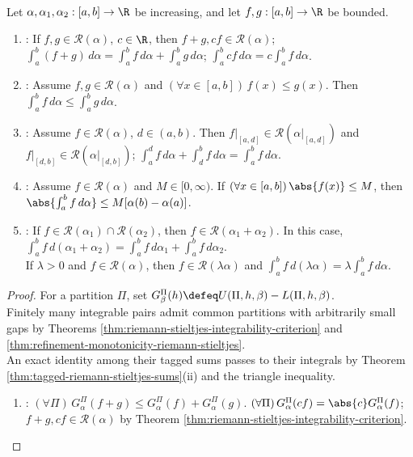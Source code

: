 \begin{theorem} \label{thm:riemann-stieltjes-integral-properties} \\
Let $\alpha,\alpha_1,\alpha_2:[a,b]\to\R$ be increasing, and let $f,g:[a,b]\to\R$ be bounded.
\begin{enumerate}[label=(\roman*)]
\setlength{\itemsep}{0pt}
\item {}: If $f,g\in\mathcal{R}(\alpha)$, $c\in\R$, then $f+g,cf\in\mathcal{R}(\alpha)$; $\int_a^b(f+g)\,d\alpha=\int_a^b f\,d\alpha+\int_a^b g\,d\alpha$; $\int_a^b cf\,d\alpha=c\int_a^b f\,d\alpha$.
\item {}: Assume $f,g\in\mathcal{R}(\alpha)$ and $(\forall x\in[a,b])\,f(x)\leq g(x)$. Then $\int_a^b f\,d\alpha\leq\int_a^b g\,d\alpha$.
\item {}: Assume $f\in\mathcal{R}(\alpha)$, $d\in(a,b)$. Then $f|_{[a,d]}\in\mathcal{R}(\alpha|_{[a,d]})$ and $f|_{[d,b]}\in\mathcal{R}(\alpha|_{[d,b]})$; $\int_a^d f\,d\alpha+\int_d^b f\,d\alpha=\int_a^b f\,d\alpha$.
\item {}: Assume $f\in\mathcal{R}(\alpha)$ and $M\in[0,\infty)$. If $(\forall x\in[a,b])\,\abs{f(x)}\leq M$, then $\abs{\int_a^b f\,d\alpha}\leq M[\alpha(b)-\alpha(a)]$.
\item {}: If $f\in\mathcal{R}(\alpha_1)\cap\mathcal{R}(\alpha_2)$, then $f\in\mathcal{R}(\alpha_1+\alpha_2)$. In this case, $\int_a^b f\,d(\alpha_1+\alpha_2)=\int_a^b f\,d\alpha_1+\int_a^b f\,d\alpha_2$.\\
If $\lambda>0$ and $f\in\mathcal{R}(\alpha)$, then $f\in\mathcal{R}(\lambda\alpha)$ and $\int_a^b f\,d(\lambda\alpha)=\lambda\int_a^b f\,d\alpha$.
\end{enumerate}
\begin{proof}
For a partition $\Pi$, set $G_\beta^\Pi(h)\defeq U(\Pi,h,\beta)-L(\Pi,h,\beta)$.\\
Finitely many integrable pairs admit common partitions with arbitrarily small gaps by Theorems \ref{thm:riemann-stieltjes-integrability-criterion} and \ref{thm:refinement-monotonicity-riemann-stieltjes}.\\
An exact identity among their tagged sums passes to their integrals by Theorem \ref{thm:tagged-riemann-stieltjes-sums}(ii) and the triangle inequality.
\begin{enumerate}[label=(\roman*)]
\setlength{\itemsep}{0pt}
\item {}: $(\forall\Pi)\,G_\alpha^\Pi(f+g)\leq G_\alpha^\Pi(f)+G_\alpha^\Pi(g)$. $(\forall\Pi)\,G_\alpha^\Pi(cf)=\abs{c}G_\alpha^\Pi(f)$; $f+g,cf\in\mathcal{R}(\alpha)$ by Theorem \ref{thm:riemann-stieltjes-integrability-criterion}.\\

\end{enumerate}
\end{proof}
\end{theorem}
